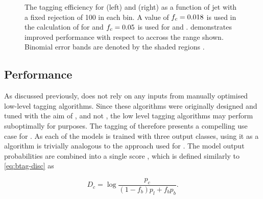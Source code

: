 \begin{figure}[!htbp]
\begin{subfigure}[b]{0.48\textwidth}
    \end{subfigure}
    \caption{The \bjet tagging efficiency for \ttbarjets (left) and \Zprimejets (right) as a function of jet \pt with a fixed \ljet rejection of 100 in each bin.
             A value of $f_c = 0.018$ is used in the calculation of \Db for \DLr and $f_c = 0.05$ is used for \GNN and \GNNLep.
             \GNN demonstrates improved performance with respect to \DLr accross the \pt range shown.
             Binomial error bands are denoted by the shaded regions \cite{ATL-PHYS-PUB-2022-027}.
             }
    \label{fig:vs_pt_flat_leff}
\end{figure}




\subsection{\texorpdfstring{\ctagging}{c-tagging} Performance}\label{sec:gnn_ctag_perf}

As discussed previously, \GNN does not rely on any inputs from manually optimised low-level tagging algorithms.
Since these algorithms were originally designed and tuned with the aim of \btag, and not \ctag, the low level tagging algorithms may perform suboptimally for \ctag purposes.
The tagging of \cjets therefore presents a compelling use case for \GNN.
As each of the models is trained with three output classes, using it as a \ctagging algorithm is trivially analogous to the approach used for \btag.
The model output probabilities are combined into a single score \Dc, which is defined similarly to \cref{eq:btag-disc} as

\begin{equation}\label{eq:ctag-disc}
    D_c = \log{\frac{p_c}{(1-f_b)p_l + f_b p_b}} .
\end{equation}

